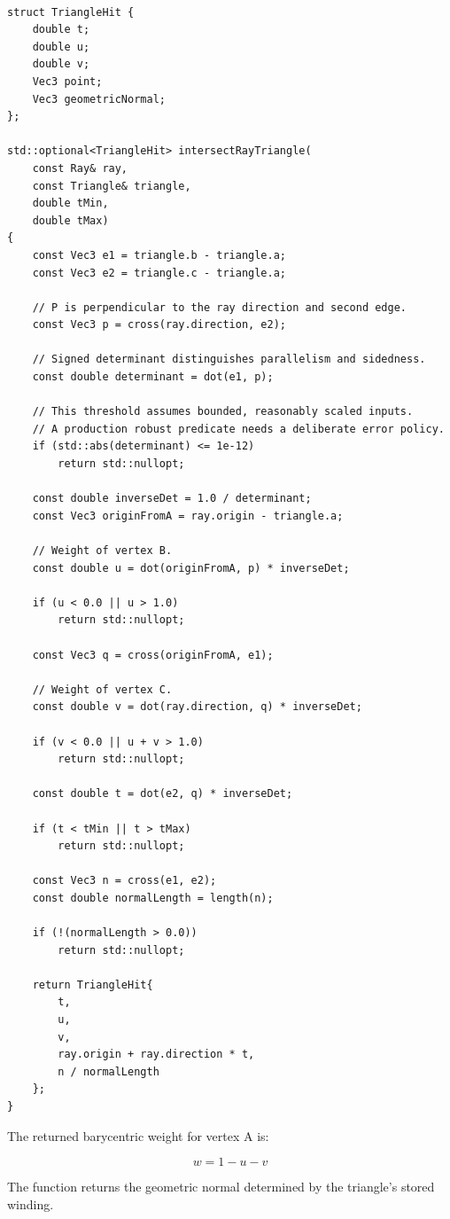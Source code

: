 \begin{verbatim}

struct TriangleHit {
    double t;
    double u;
    double v;
    Vec3 point;
    Vec3 geometricNormal;
};

std::optional<TriangleHit> intersectRayTriangle(
    const Ray& ray,
    const Triangle& triangle,
    double tMin,
    double tMax)
{
    const Vec3 e1 = triangle.b - triangle.a;
    const Vec3 e2 = triangle.c - triangle.a;

    // P is perpendicular to the ray direction and second edge.
    const Vec3 p = cross(ray.direction, e2);

    // Signed determinant distinguishes parallelism and sidedness.
    const double determinant = dot(e1, p);

    // This threshold assumes bounded, reasonably scaled inputs.
    // A production robust predicate needs a deliberate error policy.
    if (std::abs(determinant) <= 1e-12)
        return std::nullopt;

    const double inverseDet = 1.0 / determinant;
    const Vec3 originFromA = ray.origin - triangle.a;

    // Weight of vertex B.
    const double u = dot(originFromA, p) * inverseDet;

    if (u < 0.0 || u > 1.0)
        return std::nullopt;

    const Vec3 q = cross(originFromA, e1);

    // Weight of vertex C.
    const double v = dot(ray.direction, q) * inverseDet;

    if (v < 0.0 || u + v > 1.0)
        return std::nullopt;

    const double t = dot(e2, q) * inverseDet;

    if (t < tMin || t > tMax)
        return std::nullopt;

    const Vec3 n = cross(e1, e2);
    const double normalLength = length(n);

    if (!(normalLength > 0.0))
        return std::nullopt;

    return TriangleHit{
        t,
        u,
        v,
        ray.origin + ray.direction * t,
        n / normalLength
    };
}
\end{verbatim}

The returned barycentric weight for vertex A is:

\[
\boxed{w=1-u-v}
\]

The function returns the geometric normal determined by the triangle's stored winding.

